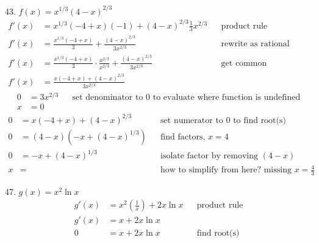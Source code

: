 \documentclass{article}
\begin{document}
\begin{description}
\begin{description}
              \item 43. $f(x) = x^{1/3}(4-x)^{2/3}$
                    \begin{align*}
                        f'(x) & = x^{1/3}(-4 + x)(-1) + (4-x)^{2/3}\frac{1}{3}x^{2/3}                                    &  & \text{product rule}                   \\[1em]
                        f'(x) & = \frac{x^{1/3}(-4 + x)}{3} + \frac{(4-x)^{2/3}}{3x^{2/3}}                               &  & \text{rewrite as rational expression} \\[1em]
                        f'(x) & = \frac{x^{1/3}(-4 + x)}{3} \cdot \frac{x^{2/3}}{x^{2/3}} + \frac{(4-x)^{2/3}}{3x^{2/3}} &  & \text{get common denominators}        \\[1em]
                        f'(x) & = \frac{x(-4 + x) + (4-x)^{2/3}}{3x^{2/3}}
                    \end{align*}
                    \begin{align*}
                        0 & = 3x^{2/3} &  & \text{set denominator to 0 to evaluate where function is undefined} \\
                        x & = 0
                    \end{align*}
                    \begin{align*}
                        0 & = x(-4 + x) + (4-x)^{2/3}     &  & \text{set numerator to 0 to find root(s)}                 \\
                        0 & = (4 - x)(-x + (4 - x)^{1/3}) &  & \text{find factors, $x=4$}                                \\
                        0 & = -x + (4 - x)^{1/3}          &  & \text{isolate factor by removing $(4-x)$}                 \\
                        x & =                             &  & \text{how to simplify from here? missing $x=\frac{4}{3}$}
                    \end{align*}
              \item 47. $g(x) = x^2\ln{x}$
                    \begin{align*}
                        g'(x)         & = x^2\left(\frac{1}{x}\right) + 2x\ln{x} &  & \text{product rule}                            \\
                        g'(x)         & = x + 2x\ln{x}                                                                               \\
                        0             & = x + 2x\ln{x}                           &  & \text{find root(s)}                            \\

\end{align*}
\end{description}
\end{description}
\end{document}
